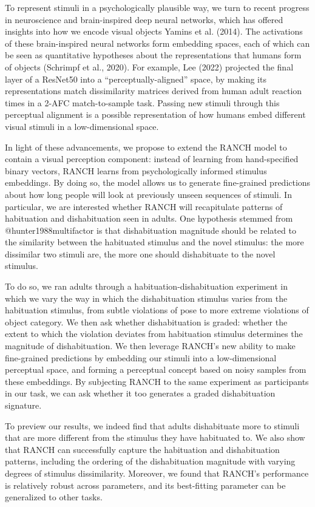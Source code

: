 \documentclass[10pt, letterpaper]{article}
\begin{document}
To represent stimuli in a psychologically plausible way, we turn to
recent progress in neuroscience and brain-inspired deep neural networks,
which has offered insights into how we encode visual objects Yamins et
al. (2014). The activations of these brain-inspired neural networks form
embedding spaces, each of which can be seen as quantitative hypotheses
about the representations that humans form of objects (Schrimpf et al.,
2020). For example, Lee (2022) projected the final layer of a ResNet50
into a ``perceptually-aligned'' space, by making its representations
match dissimilarity matrices derived from human adult reaction times in
a 2-AFC match-to-sample task. Passing new stimuli through this
perceptual alignment is a possible representation of how humans embed
different visual stimuli in a low-dimensional space.

In light of these advancements, we propose to extend the RANCH model to
contain a visual perception component: instead of learning from
hand-specified binary vectors, RANCH learns from psychologically
informed stimulus embeddings. By doing so, the model allows us to
generate fine-grained predictions about how long people will look at
previously unseen sequences of stimuli. In particular, we are interested
whether RANCH will recapitulate patterns of habituation and
dishabituation seen in adults. One hypothesis stemmed from
@hunter1988multifactor is that dishabituation magnitude should be
related to the similarity between the habituated stimulus and the novel
stimulus: the more dissimilar two stimuli are, the more one should
dishabituate to the novel stimulus.

To do so, we ran adults through a habituation-dishabituation experiment
in which we vary the way in which the dishabituation stimulus varies
from the habituation stimulus, from subtle violations of pose to more
extreme violations of object category. We then ask whether
dishabituation is graded: whether the extent to which the violation
deviates from habituation stimulus determines the magnitude of
dishabituation. We then leverage RANCH's new ability to make
fine-grained predictions by embedding our stimuli into a low-dimensional
perceptual space, and forming a perceptual concept based on noisy
samples from these embeddings. By subjecting RANCH to the same
experiment as participants in our task, we can ask whether it too
generates a graded dishabituation signature.

To preview our results, we indeed find that adults dishabituate more to
stimuli that are more different from the stimulus they have habituated
to. We also show that RANCH can successfully capture the habituation and
dishabituation patterns, including the ordering of the dishabituation
magnitude with varying degrees of stimulus dissimilarity. Moreover, we
found that RANCH's performance is relatively robust across parameters,
and its best-fitting parameter can be generalized to other tasks.
\end{document}
